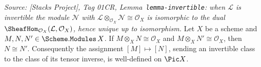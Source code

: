 \begin{lemma}


  \label{lem:isinvertible_inverse_welldef}
  \textit{Source: [Stacks Project], Tag 01CR, Lemma~\texttt{lemma-invertible}: when
  \(\mathcal{L}\) is invertible the module \(\mathcal{N}\) with
  \(\mathcal{L} \otimes_{\mathcal{O}_X} \mathcal{N} \cong \mathcal{O}_X\) is
  isomorphic to the dual \(\SheafHom_{\mathcal{O}_X}(\mathcal{L}, \mathcal{O}_X)\),
  hence unique up to isomorphism.}
  Let \(X\) be a scheme and \(M, N, N' \in \Scheme.\mathtt{Modules}\,X\). If
  \(M \otimes_X N \cong \mathcal{O}_X\) and \(M \otimes_X N' \cong \mathcal{O}_X\),
  then \(N \cong N'\). Consequently the assignment \([M] \mapsto [N]\), sending an
  invertible class to the class of its tensor inverse, is well-defined on
  \(\Pic X\).
\end{lemma}

